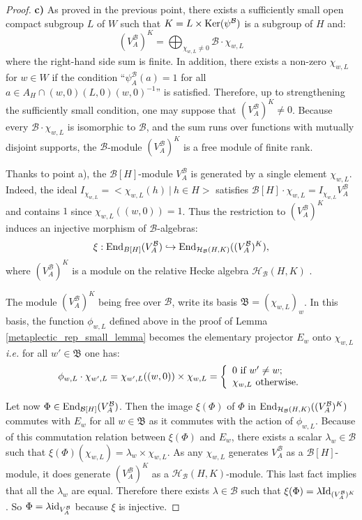 \documentclass[11pt]{article}
\theoremstyle{plain}
\theoremstyle{definition}
\theoremstyle{plain}
\theoremstyle{definition}
\theoremstyle{plain}
\begin{document}
\begin{proof}
\noindent \textbf{c)} As proved in the previous point, there exists a sufficiently small open compact subgroup $L$ of $W$ such that $K=L\times \textup{Ker}(\psi^\mathcal{B})$ is a subgroup of $H$ and:
$$(V_A^\mathcal{B})^K = \bigoplus_{\chi_{w,L} \neq 0} \mathcal{B} \cdot \chi_{w,L}$$
where the right-hand side sum is finite. In addition, there exists a non-zero $\chi_{w,L}$ for $w \in W$ if the condition ``$\psi_A^{\mathcal{B}}(a) = 1$ for all $a \in A_H \cap (w,0)(L,0)(w,0)^{-1}$'' is satisfied. Therefore, up to strengthening the sufficiently small condition, one may suppose that $(V_A^\mathcal{B})^K \neq 0$. Because every $\mathcal{B} \cdot \chi_{w,L}$ is isomorphic to $\mathcal{B}$, and the sum runs over functions with mutually disjoint supports, the $\mathcal{B}$-module $(V_A^\mathcal{B})^K$ is a free module of finite rank.

Thanks to point a), the $\mathcal{B}[H]$-module $V_A^\mathcal{B}$ is generated by a single element $\chi_{w,L}$. Indeed, the ideal $I_{\chi_{w,L}}=< \chi_{w,L}(h) \ | \ h \in H>$ satisfies $\mathcal{B}[H] \cdot \chi_{w,L} = I_{\chi_{w,L}} V_A^\mathcal{B}$ and contains $1$ since $\chi_{w,L}((w,0))=1$. Thus the restriction to $(V_A^\mathcal{B})^K$ induces an injective morphism of $\mathcal{B}$-algebras:
$$\xi : \textup{End}_{B[H]}(V_A^\mathcal{B}) \hookrightarrow  \textup{End}_{\mathcal{H}_\mathcal{B}(H,K)}((V_A^\mathcal{B})^K),$$
where $(V_A^\mathcal{B})^K$ is a module on the relative Hecke algebra $\mathcal{H}_\mathcal{B}(H,K)$ \cite[I.4.5]{vig_book}.

The module $(V_A^\mathcal{B})^K$ being free over $\mathcal{B}$, write its basis $\mathfrak{B}= (\chi_{w,L})_w$. In this basis, the function $\phi_{w,L}$ defined above in the proof of Lemma \ref{metaplectic_rep_small_lemma} becomes the elementary projector $E_w$ onto $\chi_{w,L}$ \textit{i.e.} for all $w' \in \mathfrak{B}$ one has:
$$\phi_{w,L} \cdot \chi_{w',L} = \chi_{w',L}((w,0)) \times \chi_{w,L} = \left\{ \begin{array}{l}
0 \textup{ if } w' \neq w; \\
\chi_{w,L} \textup{ otherwise}. \end{array} \right.$$

Let now $\Phi \in \textup{End}_{\mathcal{B}[H]}(V_A^\mathcal{B})$. Then the image $\xi(\Phi)$ of $\Phi$ in $\textup{End}_{\mathcal{H}_\mathcal{B}(H,K)}((V_A^\mathcal{B})^K)$ commutes with $E_w$ for all $w \in \mathfrak{B}$ as it commutes with the action of $\phi_{w,L}$. Because of this commutation relation between $\xi(\Phi)$ and $E_w$, there exists a scalar $\lambda_w \in \mathcal{B}$ such that $\xi(\Phi)(\chi_{w,L}) = \lambda_w \times \chi_{w,L}$. As any $\chi_{w,L}$ generates $V_A^\mathcal{B}$ as a $\mathcal{B}[H]$-module, it does generate $(V_A^\mathcal{B})^K$ as a $\mathcal{H}_\mathcal{B}(H,K)$-module. This last fact implies that all the $\lambda_w$ are equal. Therefore there exists $\lambda \in \mathcal{B}$ such that $\xi(\Phi) = \lambda \textup{Id}_{(V_A^\mathcal{B})^K}$. So $\Phi = \lambda \textup{id}_{V_A^\mathcal{B}}$ because $\xi$ is injective. \end{proof}
\end{document}
